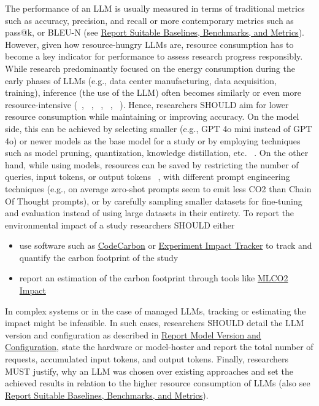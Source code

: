 \begin{itemize}
The performance of an LLM is usually measured in terms of traditional metrics such as accuracy, precision, and recall or more contemporary metrics such as pass@k, or BLEU-N (see \href{/guidelines/report-baselines-benchmarks-and-metrics}{Report Suitable Baselines, Benchmarks, and Metrics}). However, given how resource-hungry LLMs are, resource consumption has to become a key indicator for performance to assess research progress responsibly. 
While research predominantly focused on the energy consumption during the early phases of LLMs (e.g., data center manufacturing, data acquisition, training), inference (the use of the LLM) often becomes similarly or even more resource-intensive (~\cite{de2023growing}, ~\cite{DBLP:conf/mlsys/WuRGAAMCBHBGGOM22}, ~\cite{DBLP:journals/corr/abs-2410-02950}, ~\cite{JIANG2024202}, ~\cite{mitu2024hidden}).
Hence, researchers SHOULD aim for lower resource consumption while maintaining or improving accuracy. On the model side, this can be achieved by selecting smaller (e.g., GPT 4o mini instead of GPT 4o) or newer models as the base model for a study or by employing techniques such as model pruning, quantization, knowledge distillation, etc. ~\cite{mitu2024hidden}. On the other hand, while using models, resources can be saved by restricting the number of queries, input tokens, or output tokens ~\cite{mitu2024hidden}, with different prompt engineering techniques (e.g., on average zero-shot prompts seem to emit less CO2 than Chain Of Thought prompts), or by carefully sampling smaller datasets for fine-tuning and evaluation instead of using large datasets in their entirety.
To report the environmental impact of a study researchers SHOULD either
\begin{itemize}
    \item use software such as \href{https://github.com/mlco2/codecarbon}{CodeCarbon} or \href{experiment-impact-tracker}{Experiment Impact Tracker} to track and quantify the carbon footprint of the study
    \item report an estimation of the carbon footprint through tools like \href{https://mlco2.github.io/impact/#about}{MLCO2 Impact}
\end{itemize}
In complex systems or in the case of managed LLMs, tracking or estimating the impact might be infeasible. In such cases, researchers SHOULD detail the LLM version and configuration as described in \href{/guidelines/report-version-and-configuration}{Report Model Version and Configuration}, state the hardware or model-hoster and report the total number of requests, accumulated input tokens, and output tokens.
Finally, researchers MUST justify, why an LLM was chosen over existing approaches and set the achieved results in relation to the higher resource consumption of LLMs (also see \href{/guidelines/report-baselines-benchmarks-and-metrics}{Report Suitable Baselines, Benchmarks, and Metrics}).


\end{itemize}
